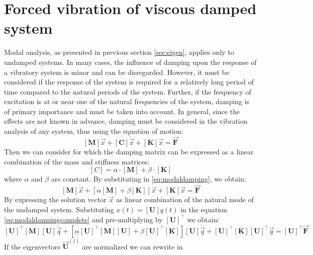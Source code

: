 \section{Forced vibration of viscous damped system}\label{sec:viscoussystem}
Modal analysis, as presented in previous section \ref{sec:eigen}, applies only
to undamped systems.
In many cases, the influence of damping upon the response of a vibratory system
is minor and can be disregarded. However, it must be considered if the response
of the system is required for a relatively long period of time compared to the
natural periods of the system. Further, if the frequency of excitation is at or
near one of the natural frequencies of the system, damping is of primary
importance and must be taken into account. In general, since the effects are not
known in advance, damping must be considered in the vibration analysis of any
system, thus using the equation of motion:
\begin{equation}\label{eq:modaldamping}
  [\mathbf{M}] \ddot{\vec{x}} + [\mathbf{C}] \dot{\vec{x}} +[\mathbf{K}] \vec{x}
   = \vec{\mathbf{F}}
\end{equation}
%
Then we can consider for which the damping matrix can be expressed as a linear
combination of the mass and stiffness matrices:
\begin{equation}
\label{eq:moadlpropdamping}
	[C] = \alpha \cdot [\mathbf{M}] + \beta \cdot [\mathbf{K}]
\end{equation}
where \(\alpha\) and \(\beta\) are constant. By substituting in
\eqref{eq:modaldamping}, we obtain:
\begin{equation}\label{eq:modaldampingcomplete}
	[\mathbf{M}] \ddot{\vec{x}} +
	[\alpha [\mathbf{M}] + \beta[\mathbf{K}]] \dot{\vec{x}} +
	[\mathbf{K}] \vec{x}= \vec{\mathbf{F}}
\end{equation}
By expressing the solution vector \(\vec{x}\) as linear combination of the
natural mode of the undamped system. Substituting \(x(t) = [\mathbf{U}]q(t)\)
in the equation \eqref{eq:modaldampingcomplete} and pre-multiplying by 
\([\mathbf{U}]^{\top}\) we obtain:
\begin{equation}\label{eq:modaldampingexpansed}
	[\mathbf{U}]^{\top}[\mathbf{M}][\mathbf{U}] \ddot{\vec{q}} +
	[\alpha[\mathbf{U}]^{\top}[\mathbf{M}][\mathbf{U}] +
   \beta[\mathbf{U}]^{\top}[\mathbf{K}]][\mathbf{U}] \dot{\vec{q}} +
	[\mathbf{U}]^{\top}[\mathbf{K}][\mathbf{U}]^{\top} \vec{q} =
  [\mathbf{U}]^{\top}\vec{\mathbf{F}}
\end{equation}
%
If the eigenvectors \(\vec{\mathbf{U}}^{(j)}\) are normalized we can rewrite in 
